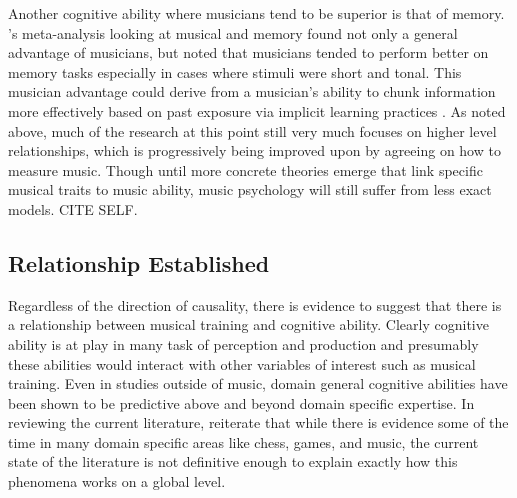 \documentclass[]{book}
\begin{document}
Another cognitive ability where musicians tend to be superior is that of memory.
\citep{talaminiMusiciansHaveBetter2017}'s meta-analysis looking at musical and memory found not only a general advantage of musicians, but noted that musicians tended to perform better on memory tasks especially in cases where stimuli were short and tonal.
This musician advantage could derive from a musician's ability to chunk information more effectively based on past exposure via implicit learning practices \citep{ettlingerImplicitMemoryMusic2011, rohrmeierImplicitLearningAcquisition2012}.
As noted above, much of the research at this point still very much focuses on higher level relationships, which is progressively being improved upon by agreeing on how to measure music.
Though until more concrete theories emerge that link specific musical traits to music ability, music psychology will still suffer from less exact models. CITE SELF.

\hypertarget{relationship-established}{%
\subsection{Relationship Established}\label{relationship-established}}

Regardless of the direction of causality, there is evidence to suggest that there is a relationship between musical training and cognitive ability.
Clearly cognitive ability is at play in many task of perception and production and presumably these abilities would interact with other variables of interest such as musical training.
Even in studies outside of music, domain general cognitive abilities have been shown to be predictive above and beyond domain specific expertise.
In reviewing the current literature, \citep{hambrickDomainGeneralModelsExpertise2019} reiterate that while there is evidence some of the time in many domain specific areas like chess, games, and music, the current state of the literature is not definitive enough to explain exactly how this phenomena works on a global level.
\end{document}
